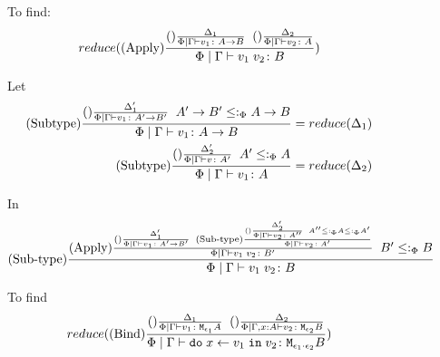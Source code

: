 \documentclass{Report}
\begin{document}

\begin{figure}\label{ReduceFunctionCases}
    \begin{framed}
    To find:
    \begin{equation}
        reduce((\text{Apply}) \frac{
            (\text{}) \frac{\Delta_1}{
                \Phi\mid\Gamma \vdash v_1 \colon A\rightarrow B
            }
            \;\;
            (\text{}) \frac{\Delta_2}{
                \Phi\mid\Gamma \vdash v_2 \colon A
            }
        }{
            \Phi\mid\Gamma \vdash v_1\; v_2 \colon B
        })
    \end{equation}

    Let
    \begin{align}
        (\text{Subtype}) \frac{
            (\text{}) \frac{\Delta'_1}{\Phi\mid\Gamma \vdash v_1 \colon A'\rightarrow B'}
            \;\;
            A'\rightarrow B'\leq:_\Phi A\rightarrow B
        }{
            \Phi\mid\Gamma \vdash v_1 \colon A\rightarrow B
        } & = reduce(\Delta_1)\\
        (\text{Subtype}) \frac{
            (\text{}) \frac{\Delta'_2}{\Phi\mid\Gamma \vdash v \colon A'}
            \;\;
            A'\leq:_\Phi A
        }{
            \Phi\mid\Gamma \vdash v_1 \colon A
        } & = reduce(\Delta_2)
    \end{align}

    In
    \begin{equation}
        (\text{Sub-type}) \frac{
            (\text{Apply}) \frac{
                (\text{}) \frac{
                    \Delta'_1
                }{
                    \Phi\mid\Gamma \vdash v_1 \colon A'\rightarrow B'
                }
            \;\;
                (\text{Sub-type}) \frac{
                    (\text{}) \frac{\Delta'_2}{\Phi\mid\Gamma \vdash v_2 \colon A''}
                    \;\;
                    A'' \leq:_\Phi A \leq:_\Phi A'
                }{
                    \Phi\mid\Gamma \vdash v_2 \colon A'
                }
            }{
                \Phi\mid\Gamma \vdash v_1\; v_2 \colon B'
            }
            \;\;
            B' \leq:_\Phi B
        }{
            \Phi\mid\Gamma \vdash v_1\; v_2 \colon B
        }
    \end{equation}



    To find
    \begin{equation}
        reduce(
            (\text{Bind}) \frac{
                (\text{}) \frac{
                    \Delta_1
                }{
                    \Phi\mid\Gamma \vdash v_1 \colon \texttt{M}_{\epsilon_1}{A}
                }
                \;\;
                (\text{}) \frac{
                    \Delta_2
                }{
                    \Phi\mid\Gamma, x: A \vdash v_2 \colon \texttt{M}_{\epsilon_2}{B}
                }
            }{
                \Phi\mid\Gamma \vdash \texttt{do}\; x \leftarrow v_1 \;\texttt{in}\; v_2 \colon \texttt{M}_{\epsilon_1\cdot\epsilon_2}{B}
            }
        )
    \end{equation}



\end{framed}
\end{figure}
\end{document}
